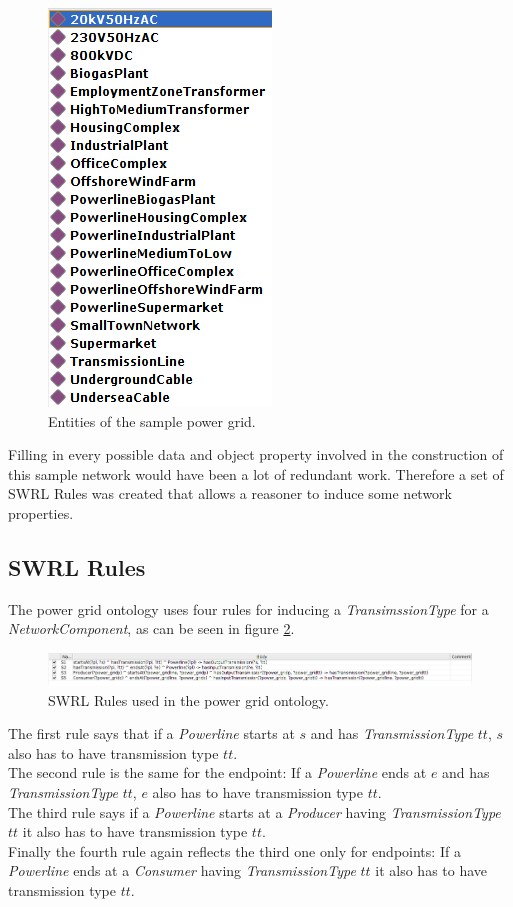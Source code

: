 \begin{figure}
\centering
\includegraphics[width=.3\textwidth]{img/entities.png}
\caption{Entities of the sample power grid.}
\label{fig:entities}
\end{figure}

Filling in every possible data and object property involved in the construction of this sample network would have been a lot of redundant work. Therefore a set of SWRL Rules was created that allows a reasoner to induce some network properties.

\subsection{SWRL Rules}

The power grid ontology uses four rules for inducing a \textit{TransimssionType} for a \textit{NetworkComponent}, as can be seen in figure \ref{fig:swrlRules}. \\

\begin{figure}[h]
\centering
\includegraphics[width=\textwidth]{img/swrlRules.png}
\caption{SWRL Rules used in the power grid ontology.}
\label{fig:swrlRules}
\end{figure}

\newpage

The first rule says that if a \textit{Powerline} starts at $s$ and has \textit{TransmissionType} $tt$,
$s$ also has to have transmission type $tt$. \\
The second rule is the same for the endpoint:
If a \textit{Powerline} ends at $e$ and has \textit{TransmissionType} $tt$,
$e$ also has to have transmission type $tt$. \\
The third rule says if a \textit{Powerline} starts at a \textit{Producer} having \textit{TransmissionType} $tt$ it also has to have transmission type $tt$. \\
Finally the fourth rule again reflects the third one only for endpoints: 
If a \textit{Powerline} ends at a \textit{Consumer} having \textit{TransmissionType} $tt$ it also has to have transmission type $tt$.

\newpage
